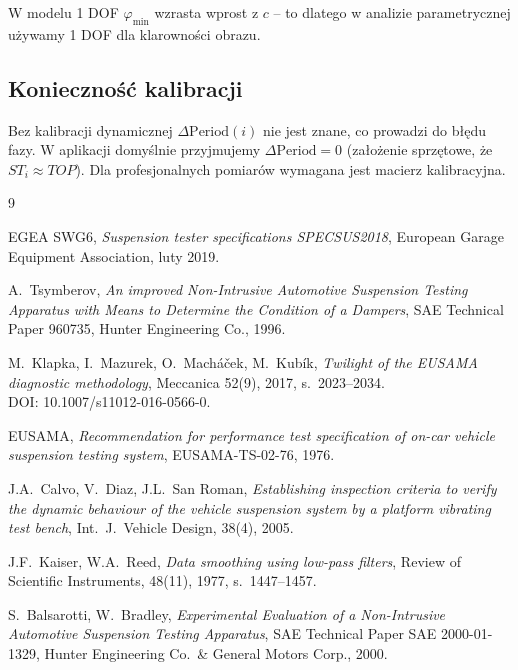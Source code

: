 \documentclass[11pt,a4paper]{article}
\theoremstyle{plainpol}
\begin{document}
W modelu 1 DOF $\varphi_{\min}$ wzrasta wprost z $c$ -- to dlatego
w analizie parametrycznej używamy 1 DOF dla klarowności obrazu.

\subsection{Konieczność kalibracji}

Bez kalibracji dynamicznej $\Delta\mathrm{Period}(i)$ nie jest znane,
co prowadzi do błędu fazy. W aplikacji domyślnie przyjmujemy
$\Delta\mathrm{Period} = 0$ (założenie sprzętowe, że $ST_i \approx TOP$).
Dla profesjonalnych pomiarów wymagana jest macierz kalibracyjna.

\begin{thebibliography}{9}

EGEA SWG6, \emph{Suspension tester specifications SPECSUS2018},
European Garage Equipment Association, luty 2019.

A.~Tsymberov, \emph{An improved Non-Intrusive Automotive Suspension Testing
Apparatus with Means to Determine the Condition of a Dampers},
SAE Technical Paper 960735, Hunter Engineering Co., 1996.

M.~Klapka, I.~Mazurek, O.~Macháček, M.~Kubík,
\emph{Twilight of the EUSAMA diagnostic methodology},
Meccanica 52(9), 2017, s.~2023--2034.\\
DOI: 10.1007/s11012-016-0566-0.

EUSAMA, \emph{Recommendation for performance test specification of on-car
vehicle suspension testing system}, EUSAMA-TS-02-76, 1976.

J.A.~Calvo, V.~Diaz, J.L.~San Roman,
\emph{Establishing inspection criteria to verify the dynamic behaviour
of the vehicle suspension system by a platform vibrating test bench},
Int.\ J.\ Vehicle Design, 38(4), 2005.

J.F.~Kaiser, W.A.~Reed, \emph{Data smoothing using low-pass filters},
Review of Scientific Instruments, 48(11), 1977, s.~1447--1457.

S.~Balsarotti, W.~Bradley,
\emph{Experimental Evaluation of a Non-Intrusive Automotive Suspension
Testing Apparatus}, SAE Technical Paper SAE 2000-01-1329,
Hunter Engineering Co.\ \& General Motors Corp., 2000.

\end{thebibliography}
\end{document}
